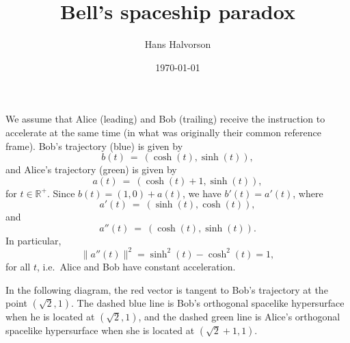 \documentclass[tikz,border=10pt,fleqn]{article}
\title{Bell's spaceship paradox}
\author{Hans Halvorson}
\date{\today}
\theoremstyle{definition}
\begin{document}
\maketitle

We assume that Alice (leading) and Bob (trailing) receive the
instruction to accelerate at the same time (in what was originally
their common reference frame). Bob's trajectory (blue) is given by
\[ b(t) \: = \: (\cosh (t),\sinh (t)) , \] and Alice's trajectory
(green) is given by
\[ a(t) \: = \: (\cosh (t)+1,\sinh (t)) ,\] for
$t\in\mathbb{R}^+$. Since $b(t)=(1,0)+a(t)$, we have $b'(t)=a'(t)$,
where \[ a'(t) \: = \: (\sinh (t),\cosh(t)) ,\] and
\[ a''(t) \: = \: (\cosh (t),\sinh (t)) .\] In particular,
\[ \| a''(t) \|^2 = \sinh ^2 (t)-\cosh ^2(t) = 1 ,\] for all $t$,
i.e.\ Alice and Bob have constant acceleration.

In the following diagram, the red vector is tangent to Bob's
trajectory at the point $(\sqrt{2},1)$. The dashed blue line is Bob's
orthogonal spacelike hypersurface when he is located at
$(\sqrt{2},1)$, and the dashed green line is Alice's orthogonal
spacelike hypersurface when she is located at $(\sqrt{2}+1,1)$.

\bigskip \noindent {}
\end{document}
